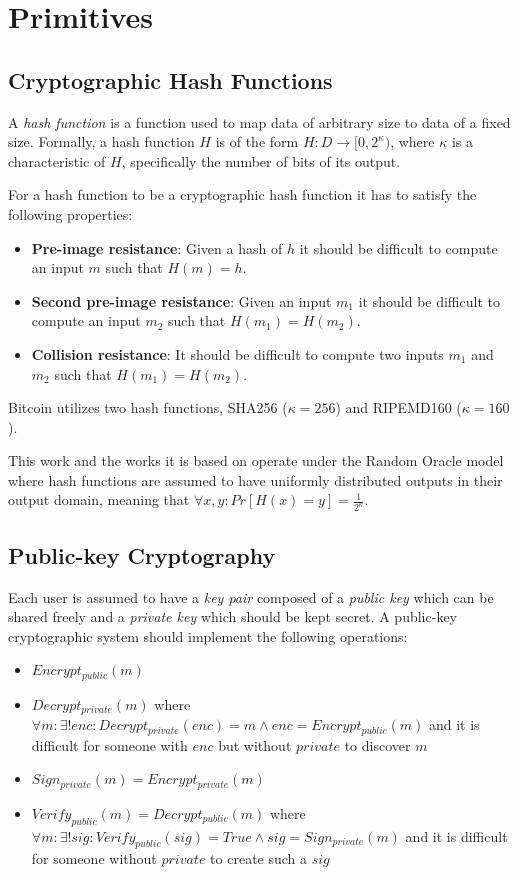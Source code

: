 \section{Primitives}
\subsection{Cryptographic Hash Functions}
A \textit{hash function} is a function used to map data of arbitrary size to data of a fixed size. Formally, a hash function $H$ is of the form $H: D \rightarrow [0, 2^\kappa)$, where $\kappa$ is a characteristic of $H$, specifically the number of bits of its output.

For a hash function to be a cryptographic hash function it has to satisfy the following properties:
\begin{itemize}
  \item \textbf{Pre-image resistance}: Given a hash of $h$ it should be difficult to compute an input $m$ such that $H(m) = h$.
  \item \textbf{Second pre-image resistance}: Given an input $m_1$ it should be difficult to compute an input $m_2$ such that $H(m_1) = H(m_2)$.
  \item \textbf{Collision resistance}: It should be difficult to compute two inputs $m_1$ and $m_2$ such that $H(m_1) = H(m_2)$.
\end{itemize}

Bitcoin utilizes two hash functions, SHA256 ($\kappa=256$) and RIPEMD160 ($\kappa=160$).

This work and the works it is based on \cite{nipopows} operate under the Random Oracle model where hash functions are assumed to have uniformly distributed outputs in their output domain, meaning that $\forall x, y: Pr[H(x) = y] = \frac{1}{2^\kappa}$.

\subsection{Public-key Cryptography}
Each user is assumed to have a \textit{key pair} composed of a \textit{public key} which can be shared freely and a \textit{private key} which should be kept secret. A public-key cryptographic system should implement the following operations:

\begin{itemize}
  \item $Encrypt_{public}(m)$
  \item $Decrypt_{private}(m)$ where $\forall m: \exists! enc: Decrypt_{private}(enc) = m \land enc = Encrypt_{public}(m)$ and it is difficult for someone with $enc$ but without $private$ to discover $m$
  \item $Sign_{private}(m) = Encrypt_{private}(m)$
  \item $Verify_{public}(m) = Decrypt_{public}(m)$ where $\forall m: \exists! sig: Verify_{public}(sig) = True \land sig = Sign_{private}(m)$ and it is difficult for someone without $private$ to create such a $sig$
\end{itemize}

